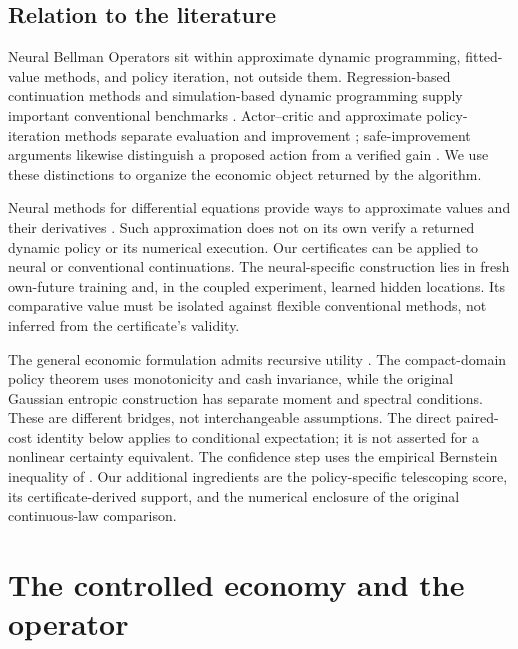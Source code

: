 \documentclass[ecta,nameyear,draft]{econsocart}
\begin{document}
\subsection{Relation to the literature}
Neural Bellman Operators sit within approximate dynamic programming, fitted-value methods, and policy iteration, not outside them. Regression-based continuation methods and simulation-based dynamic programming supply important conventional benchmarks \citep{judd1998,powell2011,longstaff2001,ernst2005}. Actor--critic and approximate policy-iteration methods separate evaluation and improvement \citep{konda1999,scherrer2015}; safe-improvement arguments likewise distinguish a proposed action from a verified gain \citep{kakade2002,pirotta2013}. We use these distinctions to organize the economic object returned by the algorithm.

Neural methods for differential equations provide ways to approximate values and their derivatives \citep{sirignano2018,han2018,hornik1990}. Such approximation does not on its own verify a returned dynamic policy or its numerical execution. Our certificates can be applied to neural or conventional continuations. The neural-specific construction lies in fresh own-future training and, in the coupled experiment, learned hidden locations. Its comparative value must be isolated against flexible conventional methods, not inferred from the certificate's validity.

The general economic formulation admits recursive utility \citep{epsteinzin1989,duffieepstein1992}. The compact-domain policy theorem uses monotonicity and cash invariance, while the original Gaussian entropic construction has separate moment and spectral conditions. These are different bridges, not interchangeable assumptions. The direct paired-cost identity below applies to conditional expectation; it is not asserted for a nonlinear certainty equivalent. The confidence step uses the empirical Bernstein inequality of \citet{maurer2009}. Our additional ingredients are the policy-specific telescoping score, its certificate-derived support, and the numerical enclosure of the original continuous-law comparison.

\section{The controlled economy and the operator}\label{sec:economy}
\end{document}
